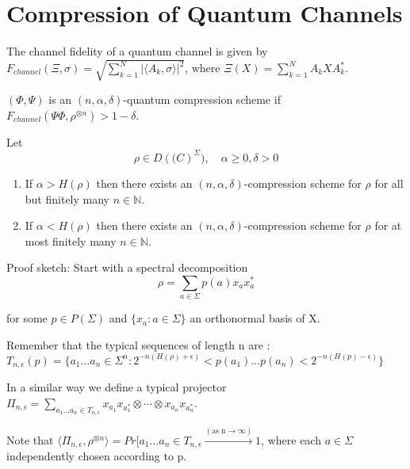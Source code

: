 \documentclass{article}
\begin{document}
    \section{Compression of Quantum Channels}
    The channel fidelity of a quantum channel is given by $
    F_{channel}(\Xi,\sigma) = \sqrt{\sum\limits_{k=1}^N |\langle A_k, \sigma
    \rangle |^2 }$, where $ \Xi(X) = \sum\limits_{k=1}^N A_k X A_k^* $.
    
    $ (\Phi,\Psi) $ is an $(n,\alpha,\delta)$-quantum compression scheme
    if $ F_{channel}(\Psi\Phi,\rho^{\otimes n}) > 1- \delta $.

    \begin{theorem}
        Let 
        \[
                \rho \in D(\mathds(C)^\Sigma),\quad \alpha \ge 0, \delta >
                0
        \]

        \begin{enumerate}
            \item If $ \alpha > H(\rho) $  then there exists an $
                (n,\alpha,\delta) $-compression scheme for $ \rho $  for
                all but finitely many $ n \in \mathds{N}$.
            \item If $ \alpha < H(\rho) $ then there exists an $
                (n,\alpha,\delta) $-compression scheme for $\rho$ for at
                most finitely many $ n \in \mathds{N} $.
        \end{enumerate}

        Proof sketch: Start with a spectral decomposition 
        \[ 
                \rho = \sum_{a\in \Sigma} p(a) x_a x_a^* 
        \]
        
        for some $ p \in P(\Sigma) $ and $\{x_a: a \in \Sigma \}$ an
        orthonormal basis of X.

        Remember that the typical sequences of length n are : $
        T_{n,\epsilon}(p) = \{a_1\ldots a_n \in \Sigma^n:
                2^{-n(H(\rho)+\epsilon)}<p(a_1)\ldots
        p(a_n)<2^{-n(H(p)-\epsilon)} \} $ 

        In a similar way we define a typical projector $
        \Pi_{n,\epsilon} = \sum_{a_1\ldots a_n \in T_{n,\epsilon}} x_a_1
        x_a_1^* \otimes \cdots \otimes x_a_n x_a_n^*$.

        Note that $\langle \Pi_{n,\epsilon}, \rho^{\otimes n} \rangle =
        Pr[a_1\ldots a_n \in T_{n,\epsilon} \xrightarrow{(\text{as n}\rightarrow
        \infty)} 1$, where each $ a \in \Sigma $ independently chosen
        according to p.


\end{theorem}
\end{document}
